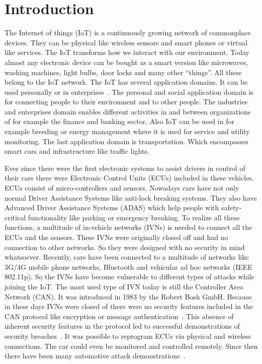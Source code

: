
\section{Introduction}

The Internet of things (IoT) is a continuously growing network of commonplace
devices. They can be physical like wireless sensors and smart phones or virtual
like services. The IoT transforms how we interact with our environment. Today
almost any electronic device can be bought as a smart version like microwaves,
washing machines, light bulbs, door locks and many other ``things''. All these
belong to the IoT network. The IoT has several application domains. It can be
used personally or in enterprises~\cite{Mahmoud2015}. The personal and social
application domain is for connecting people to their environment and to other
people. The industries and enterprises domain enables different activities in
and between organizations of for example the finance and banking sector. Also
IoT can be used in for example breeding or energy management where it is used
for service and utility monitoring. The last application domain is
transportation. Which encompasses smart cars and infrastructure like traffic
lights.

Ever since there were the first electronic systems to assist drivers in control
of their cars there were Electronic Control Units (ECUs) included in these
vehicles. ECUs consist of micro-controllers and sensors. Nowadays cars have not
only normal Driver Assistance Systems like anti-lock breaking systems. They also
have Advanced Driver Assistance Systems (ADAS) which help people with
safety-critical functionality like parking or emergency breaking. To realize all
these functions, a multitude of in-vehicle networks (IVNs) is needed to connect
all the ECUs and the sensors. These IVNs were originally closed off and had no
connection to other networks. So they were designed with no security in mind
whatsoever. Recently, cars have been connected to a multitude of networks like
3G/4G mobile phone networks, Bluetooth and vehicular ad hoc networks (IEEE
802.11p). So the IVNs have become vulnerable to different types of attacks while
joining the IoT. The most used type of IVN today is still the Controller Area
Network (CAN). It was introduced in 1983 by the Robert Bosh GmbH. Because in
these days IVNs were closed of there were no security features included in the
CAN protocol like encryption or message authentication~\cite{Avatefipour2017}.
This absence of inherent security features in the protocol led to successful
demonstrations of security breaches~\cite{Koscher2010}. It was possible to
reprogram ECUs via physical and wireless connections. The car could even be
monitored and controlled remotely. Since then there have been many automotive
attack demonstrations~\cite{Hoppe2011,Checkoway2011,Cheah2017}.

